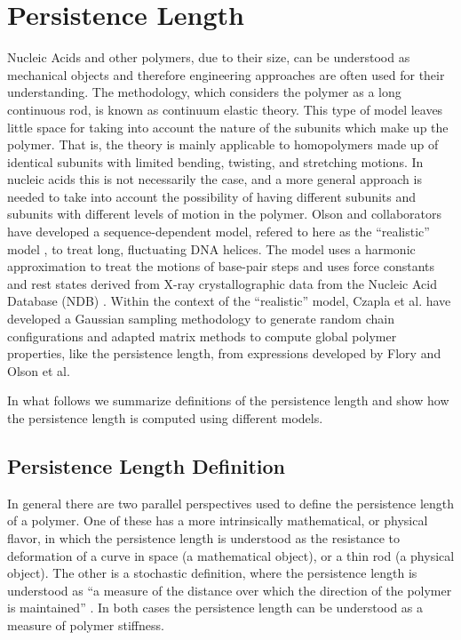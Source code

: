 \chapter{Persistence Length}
\label{appendix4a}

Nucleic Acids and other polymers, due to their size, can be understood
as  mechanical  objects  \cite{marko2003,  nelson2004}  and  therefore
engineering approaches  are often  used for their  understanding.  The
methodology, which considers the polymer  as a long continuous rod, is
known as continuum  elastic theory.  This type of  model leaves little
space for taking into account the nature of the subunits which make up
the polymer. That is, the  theory is mainly applicable to homopolymers
made  up of  identical subunits  with limited  bending,  twisting, and
stretching  motions.  In  nucleic acids  this is  not  necessarily the
case, and a  more general approach is needed to  take into account the
possibility of  having different subunits and  subunits with different
levels  of  motion  in  the  polymer.  Olson  and  collaborators  have
developed  a   sequence-dependent  model,  refered  to   here  as  the
``realistic'' model  \cite{olson1993}, to treat  long, fluctuating DNA
helices.  The model uses a harmonic approximation to treat the motions
of base-pair  steps and uses  force constants and rest  states derived
from X-ray crystallographic data  from the Nucleic Acid Database (NDB)
\cite{go1976,  olson1998}.  Within  the context  of  the ``realistic''
model,  Czapla et  al.   \cite{czapla2006} have  developed a  Gaussian
sampling  methodology  to  generate  random chain  configurations  and
adapted matrix methods to  compute global polymer properties, like the
persistence    length,   from    expressions   developed    by   Flory
\cite{flory1969} and Olson et al. \cite{maroun1988a, marky1994a}

In what follows we summarize definitions of the persistence length and
show how the persistence length is computed using different models.

\section{Persistence Length Definition}
In  general there  are two  parallel perspectives  used to  define the
persistence length of a polymer. One of these has a more intrinsically
mathematical, or  physical flavor, in which the  persistence length is
understood as  the resistance  to deformation of  a curve in  space (a
mathematical object), or a thin rod (a physical object).  The other is
a stochastic definition, where the persistence length is understood as
``a measure of the distance over which the direction of the polymer is
maintained'' \cite{kratky1949}.  In  both cases the persistence length
can be understood as a measure of polymer stiffness.

